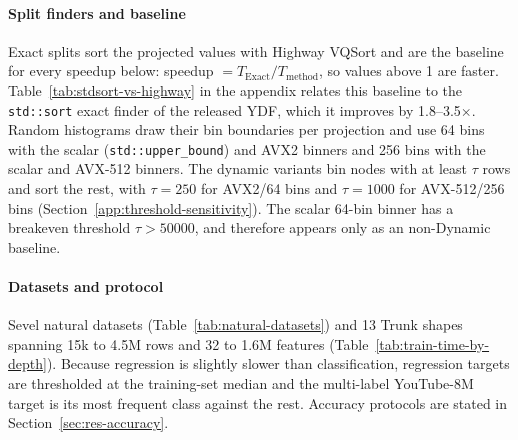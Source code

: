\documentclass[sigconf,anonymous,review]{acmart}
\begin{document}
\paragraph{Split finders and baseline} Exact splits sort the projected values with Highway VQSort and are the baseline for every speedup below: speedup $= T_{\mathrm{Exact}}/T_{\mathrm{method}}$, so values above 1 are faster. Table~\ref{tab:stdsort-vs-highway} in the appendix relates this baseline to the \texttt{std::sort} exact finder of the released YDF, which it improves by 1.8--3.5$\times$. Random histograms draw their bin boundaries per projection and use 64 bins with the scalar (\texttt{std::upper\_bound}) and AVX2 binners and 256 bins with the scalar and AVX-512 binners. The dynamic variants bin nodes with at least $\tau$ rows and sort the rest, with $\tau=250$ for AVX2/64 bins and $\tau=1000$ for AVX-512/256 bins (Section~\ref{app:threshold-sensitivity}). The scalar 64-bin binner has a breakeven threshold $\tau>50000$, and therefore appears only as an non-Dynamic baseline.

\paragraph{Datasets and protocol} Sevel natural datasets (Table~\ref{tab:natural-datasets}) and 13 Trunk shapes spanning 15k to 4.5M rows and 32 to 1.6M features (Table~\ref{tab:train-time-by-depth}). Because regression is slightly slower than classification, regression targets are thresholded at the training-set median and the multi-label YouTube-8M target is its most frequent class against the rest. 
Accuracy protocols are stated in Section~\ref{sec:res-accuracy}.



\end{document}
